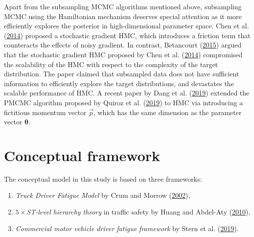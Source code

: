 \documentclass[12pt]{book}
\numberwithin{equation}{chapter}
\providecommand{\tightlist}{%
  \setlength{\itemsep}{0pt}\setlength{\parskip}{0pt}}
\begin{document}
Apart from the subsampling MCMC algorithms mentioned above, subsampling MCMC using the Hamiltonian mechanism deserves special attention as it more efficiently explores the posterior in high-dimensional parameter space. Chen et al. (\protect\hyperlink{ref-chen2014stochastic}{2014}) proposed a stochastic gradient HMC, which introduces a friction term that counteracts the effects of noisy gradient. In contrast, Betancourt (\protect\hyperlink{ref-betancourt2015fundamental}{2015}) argued that the stochastic gradient HMC proposed by Chen et al. (\protect\hyperlink{ref-chen2014stochastic}{2014}) compromised the scalability of the HMC with respect to the complexity of the target distribution. The paper claimed that subsampled data does not have sufficient information to efficiently explore the target distributions, and devastates the scalable performance of HMC. A recent paper by Dang et al. (\protect\hyperlink{ref-dang2019hamiltonian}{2019}) extended the PMCMC algorithm proposed by Quiroz et al. (\protect\hyperlink{ref-quiroz2019speeding}{2019}) to HMC via introducing a fictitious momentum vector \(\vec{p}\), which has the same dimension as the parameter vector \(\mathbf{\theta}\).

\hypertarget{conceptual-framework}{%
\section{Conceptual framework}\label{conceptual-framework}}

The conceptual model in this study is based on three frameworks:

\begin{enumerate}
\def\labelenumi{\arabic{enumi}.}
\tightlist
\item
  \emph{Truck Driver Fatigue Model} by Crum and Morrow (\protect\hyperlink{ref-crum2002influence}{2002}),
\item
  \emph{\(5 \times\)ST-level hierarchy theory} in traffic safety by Huang and Abdel-Aty (\protect\hyperlink{ref-huang2010multilevel}{2010}),
\item
  \emph{Commercial motor vehicle driver fatigue framework} by Stern et al. (\protect\hyperlink{ref-stern2019data}{2019}).
\end{enumerate}
\end{document}
